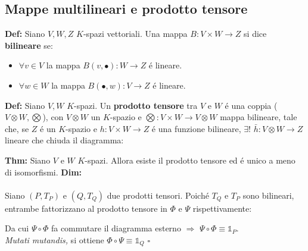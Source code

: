 \documentclass[a4paper,11pt]{article}
\newcommand{\cart}{\times}
\newcommand{\ten}{\otimes}
\newcommand{\Tensor}{\bigotimes}
\newcommand{\function}[3]{#1:#2 \rightarrow #3}
\newcommand{\thm}{\vskip 0.05cm \noindent \textbf{Thm:} }
\newcommand{\proof}{\vskip 0.05cm \noindent \textbf{Dim:} }
\newcommand{\definition}{\vskip 0.05cm \noindent \textbf{Def:} }
\newcommand{\uniqueness}{\framebox[\width]{ ! }}
\begin{document}
\subsection{Mappe multilineari e prodotto tensore}
\definition Siano $V, W, Z$ $K$-spazi vettoriali. Una mappa $\function{B}{V\cart W}{Z}$ si dice {\bf bilineare} se:
\begin{itemize}
\item $\forall v\in V$ la mappa $\function{B(v, \bullet)}{W}{Z}$ \'e lineare.
\item $\forall w\in W$ la mappa $\function{B(\bullet, w)}{V}{Z}$ \'e lineare.
\end{itemize}
\definition Siano $V, W$ $K$-spazi. Un {\bf prodotto tensore} tra $V$ e $W$ \'e una coppia ($V\ten W,\Tensor$), con $V\ten W$ un $K$-spazio e $\function{\Tensor}{V\cart W}{V\ten W}$ mappa bilineare, tale che, se $Z$ \'e un $K$-spazio e $\function{h}{V\cart W}{Z}$ \'e una funzione bilineare, $\exists !$ $\function{\bar h}{V\ten W}{Z}$ lineare che chiuda il diagramma:
\begin{center}
\end{center}

\thm Siano $V$ e $W$ $K$-spazi. Allora esiste il prodotto tensore ed \'e unico a meno di isomorfismi.
\proof \\
\uniqueness\\
Siano $(P,T_{P})$ e $(Q, T_{Q})$ due prodotti tensori. Poich\'e $T_{Q}$ e $T_{P}$ sono bilineari, entrambe fattorizzano al prodotto tensore in $\Phi$ e $\Psi$ rispettivamente: 

\begin{center}
\end{center}
Da cui $\Psi\circ\Phi$ fa commutare il diagramma esterno $\Rightarrow$ $\Psi\circ\Phi \equiv \mathds{1}_{P}$.\\
{\it Mutati mutandis,} si ottiene $\Phi\circ\Psi \equiv \mathds{1}_{Q}$ \hfill $\square$
\end{document}
